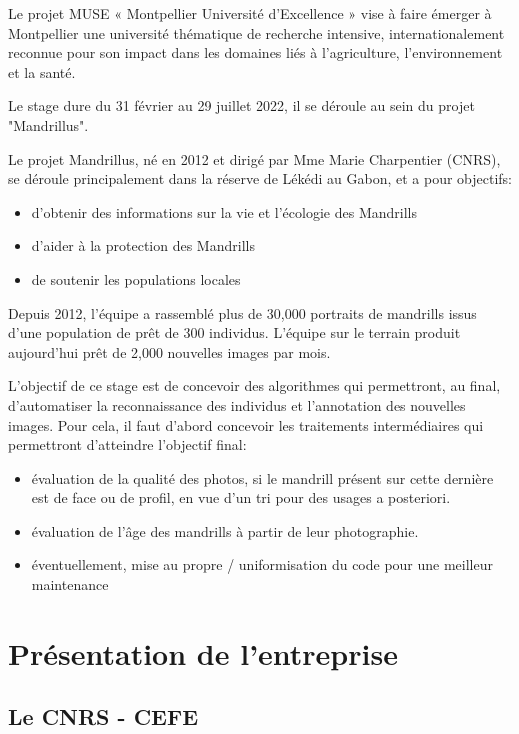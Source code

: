\documentclass[a4paper,12pt]{article}
\begin{document}
Le projet MUSE « Montpellier Université d’Excellence » vise à faire émerger à Montpellier une université thématique de recherche intensive, internationalement reconnue pour son impact dans les domaines liés à l’agriculture, l’environnement et la santé.\newline

Le stage dure du 31 février au 29 juillet 2022, il se déroule au sein du projet "Mandrillus".\newline

Le projet Mandrillus, né en 2012 et dirigé par Mme Marie Charpentier (CNRS), se déroule principalement dans la réserve de Lékédi au Gabon, et a pour objectifs:
\begin{itemize}
    \item d'obtenir des informations sur la vie et l'écologie des Mandrills
    \item d'aider à la protection des Mandrills
    \item de soutenir les populations locales\newline
\end{itemize}


Depuis 2012, l’équipe a rassemblé plus de 30,000 portraits de mandrills issus d'une population de prêt de 300 individus. L'équipe sur le terrain produit aujourd'hui prêt de 2,000 nouvelles images par mois.\newline

L'objectif de ce stage est de concevoir des algorithmes qui permettront, au final, d'automatiser la reconnaissance des individus et l'annotation des nouvelles images. Pour cela, il faut d'abord concevoir les traitements intermédiaires qui permettront d'atteindre l'objectif final:  
\begin{itemize}
    \item évaluation de la qualité des photos, si le mandrill présent sur cette dernière est de face ou de profil, en vue d'un tri pour des usages a posteriori.
    \item évaluation de l'âge des mandrills à partir de leur photographie.
    \item éventuellement, mise au propre / uniformisation du code pour une meilleur maintenance
\end{itemize}
\newpage
\section{Présentation de l'entreprise} 

\subsection{Le CNRS - CEFE}
\end{document}
